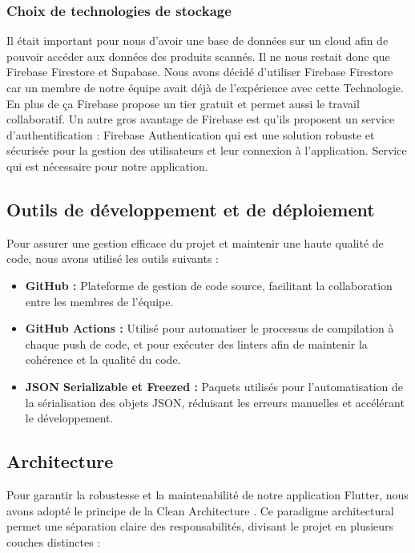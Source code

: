 \subsubsection{Choix de technologies de stockage}

Il était important pour nous d'avoir une base de données sur un cloud afin de pouvoir accéder aux données des produits scannés. Il ne nous restait donc que Firebase Firestore et Supabase. Nous avons décidé d'utiliser Firebase Firestore car un membre de notre équipe avait déjà de l'expérience avec cette Technologie. En plus de ça Firebase propose un tier gratuit et permet aussi le travail collaboratif. Un autre gros avantage de Firebase est qu'ils proposent un service d'authentification : Firebase Authentication qui est une solution robuste et sécurisée pour la gestion des utilisateurs et leur connexion à l'application. Service qui est nécessaire pour notre application.



\subsection{Outils de développement et de déploiement}

Pour assurer une gestion efficace du projet et maintenir une haute qualité de code, nous avons utilisé les outils suivants :

\begin{itemize}[noitemsep]
    \item \textbf{GitHub :} Plateforme de gestion de code source, facilitant la collaboration entre les membres de l'équipe.
    \item \textbf{GitHub Actions :} Utilisé pour automatiser le processus de compilation à chaque push de code, et pour exécuter des linters afin de maintenir la cohérence et la qualité du code.
    \item \textbf{JSON Serializable et Freezed :} Paquets utilisés pour l'automatisation de la sérialisation des objets JSON, réduisant les erreurs manuelles et accélérant le développement.
\end{itemize}

\subsection{Architecture}
\label{sec:architecture}

Pour garantir la robustesse et la maintenabilité de notre application Flutter, nous avons adopté le principe de la Clean Architecture \cite{cleanArchitecture}. Ce paradigme architectural permet une séparation claire des responsabilités, divisant le projet en plusieurs couches distinctes :

